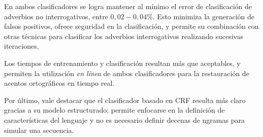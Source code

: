 \documentclass[runningheads,a4paper]{llncs}
\begin{document}
En ambos clasificadores se logra mantener al m\'inimo el error de clasificaci\'on de adverbios no interrogativos, entre $0,02-0,04\%$. Esto minimiza la generaci\'on de falsos positivos, ofrece seguridad en la clasificaci\'on, y permite su combinaci\'on con otras t\'ecnicas para clasificar los adverbios interrogativos realizando sucesivas iteraciones.

Los tiempos de entrenamiento y clasificación resultan más que aceptables, y permiten la utilización \emph{en línea} de ambos clasificadores para la restauración de acentos ortogr\'aficos en tiempo real.

Por \'ultimo, vale destacar que el clasificador basado en CRF resulta m\'as claro gracias a su modelo estructurado; permite enfocarse en la definición de características del lenguaje y no es necesario definir decenas de ngramas para simular una secuencia.



\end{document}
